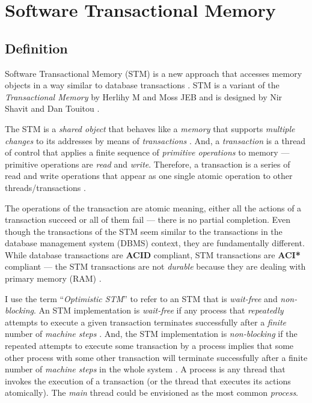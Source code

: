 \documentclass[../main]{subfiles}
\begin{document}
  \section{Software Transactional Memory}

  \subsection{Definition}

  \par
  Software Transactional Memory (STM) is a new approach that accesses memory objects in a way similar to database transactions \cite{weimerskirch2008software}. STM is a variant of the {\em Transactional Memory} by Herlihy M and Moss JEB and is designed by Nir Shavit and Dan Touitou \cite{weimerskirch2008software}\cite{Shavit1997}. \par

  The STM is a {\em shared object} that behaves like a {\em memory} that supports {\em multiple changes} to its addresses by means of {\em transactions} \cite{Shavit1997}. And, a {\em transaction} is a thread of control that applies a finite sequence of {\em primitive operations} to memory --- primitive operations are {\em read} and {\em write}. Therefore, a transaction is a series of read and write operations that appear as one single atomic operation to other threads/transactions \cite{weimerskirch2008software}. \par

  The operations of the transaction are atomic meaning, either all the actions of a transaction succeed or all of them fail --- there is no partial completion. Even though the transactions of the STM seem similar to the transactions in the database management system (DBMS) context, they are fundamentally different. While database transactions are {\bf ACID} compliant, STM transactions are {\bf ACI*} compliant --- the STM transactions are not {\em durable} because they are dealing with primary memory (RAM) \cite{weimerskirch2008software}. \par

  I use the term ``{\em Optimistic STM}'' to refer to an STM that is {\em wait-free} and {\em non-blocking}.
  An STM implementation is {\em wait-free} if any process that {\em repeatedly} attempts to execute a given transaction terminates successfully after a {\em finite} number of {\em machine steps} \cite{Shavit1997}. And, the STM implementation is {\em non-blocking} if the repeated attempts to execute some transaction by a process implies that some other process with some other transaction will terminate successfully after a finite number of {\em machine steps} in the whole system \cite{Shavit1997}. A process is any thread that invokes the execution of a transaction (or the thread that executes its actions atomically). The {\em main} thread could be envisioned as the most common {\em process}. \par
\end{document}
